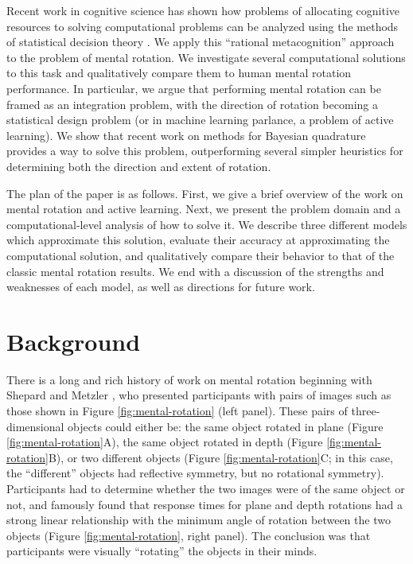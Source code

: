 \documentclass{article} %
\begin{document}
Recent work in cognitive science has shown how problems of allocating
cognitive resources to solving computational problems can be analyzed
using the methods of statistical decision theory
\cite{Lieder:2012wg,Vul:2009wy}. We apply this ``rational
metacognition'' approach to the problem of mental rotation. We
investigate several computational solutions to this task and
qualitatively compare them to human mental rotation performance. In
particular, we argue that performing mental rotation can be framed as
an integration problem, with the direction of rotation becoming a
statistical design problem (or in machine learning parlance, a problem
of active learning). We show that recent work on methods for Bayesian
quadrature \cite{Diaconis:1988uo,OHagan:1991tx,Osborne:2012tm}
provides a way to solve this problem, outperforming several simpler
heuristics for determining both the direction and extent of rotation.

The plan of the paper is as follows. First, we give a brief overview
of the work on mental rotation and active learning. Next, we present
the problem domain and a computational-level analysis of how to solve
it. We describe three different models which approximate this
solution, evaluate their accuracy at approximating the computational
solution, and qualitatively compare their behavior to that of the
classic mental rotation results. We end with a discussion of the
strengths and weaknesses of each model, as well as directions for
future work.


\section{Background}

There is a long and rich history of work on mental rotation beginning
with Shepard and Metzler \cite{Shepard1971}, who presented
participants with pairs of images such as those shown in Figure
\ref{fig:mental-rotation} (left panel). These pairs of
three-dimensional objects could either be: the same object rotated in
plane (Figure \ref{fig:mental-rotation}A), the same object rotated in
depth (Figure \ref{fig:mental-rotation}B), or two different objects
(Figure \ref{fig:mental-rotation}C; in this case, the ``different''
objects had reflective symmetry, but no rotational
symmetry). Participants had to determine whether the two images were
of the same object or not, and \cite{Shepard1971} famously found that
response times for plane and depth rotations had a strong linear
relationship with the minimum angle of rotation between the two
objects (Figure \ref{fig:mental-rotation}, right panel). The
conclusion was that participants were visually ``rotating'' the
objects in their minds.
\end{document}
